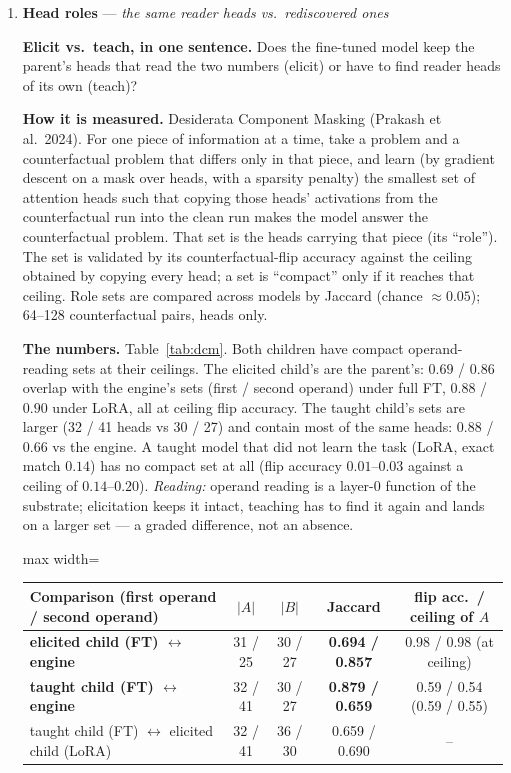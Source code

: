 \documentclass[11pt]{article}
\newcommand{\what}[1]{\par\noindent\textbf{Elicit vs.\ teach, in one sentence.} #1}
\newcommand{\how}[1]{\par\noindent\textbf{How it is measured.} #1}
\newcommand{\numbers}[1]{\par\noindent\textbf{The numbers.} #1\par\medskip}
\newcommand{\metricsec}[2]{\item \textbf{#1} --- \emph{#2}}
\begin{document}
\begin{enumerate}[label=\textbf{M\arabic*}, leftmargin=*, itemsep=1.2em, resume]
\metricsec{Head roles}{the same reader heads vs.\ rediscovered ones}
\what{Does the fine-tuned model keep the parent's heads that read the two numbers (elicit) or
have to find reader heads of its own (teach)?}
\how{Desiderata Component Masking (Prakash et al.\ 2024). For one piece of information at a
time, take a problem and a counterfactual problem that differs only in that piece, and learn
(by gradient descent on a mask over heads, with a sparsity penalty) the smallest set of
attention heads such that copying those heads' activations from the counterfactual run into the
clean run makes the model answer the counterfactual problem. That set is the heads carrying that
piece (its ``role''). The set is validated by its counterfactual-flip accuracy against the
ceiling obtained by copying every head; a set is ``compact'' only if it reaches that ceiling.
Role sets are compared across models by Jaccard (chance $\approx0.05$); 64--128 counterfactual
pairs, heads only.}
\numbers{Table~\ref{tab:dcm}. Both children have compact operand-reading sets at their
ceilings. The elicited child's are the parent's: $0.69$ / $0.86$ overlap with the engine's sets
(first / second operand) under full FT, $0.88$ / $0.90$ under LoRA, all at ceiling flip
accuracy. The taught child's sets are larger (32 / 41 heads vs 30 / 27) and contain most of the
same heads: $0.88$ / $0.66$ vs the engine. A taught model that did not learn the task (LoRA,
exact match $0.14$) has no compact set at all (flip accuracy $0.01$--$0.03$ against a ceiling of
$0.14$--$0.20$). \emph{Reading:} operand reading is a layer-0 function of the substrate;
elicitation keeps it intact, teaching has to find it again and lands on a larger set --- a graded
difference, not an absence.}
\begin{table}[h]\centering\small
\begin{adjustbox}{max width=\textwidth}
\begin{tabular}{lcccc}
\toprule
Comparison (first operand / second operand) & $|A|$ & $|B|$ & Jaccard & flip acc.\ / ceiling of $A$ \\
\midrule
\textbf{elicited child (FT) $\leftrightarrow$ engine} & 31 / 25 & 30 / 27 & \textbf{0.694 / 0.857} & 0.98 / 0.98 (at ceiling) \\
\textbf{taught child (FT) $\leftrightarrow$ engine} & 32 / 41 & 30 / 27 & \textbf{0.879 / 0.659} & 0.59 / 0.54 (0.59 / 0.55) \\
taught child (FT) $\leftrightarrow$ elicited child (LoRA) & 32 / 41 & 36 / 30 & 0.659 / 0.690 & -- \\

\end{tabular}
\end{adjustbox}
\end{table}
\end{enumerate}
\end{document}

